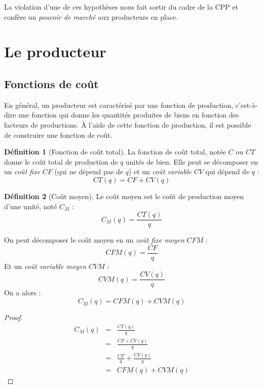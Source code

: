 \documentclass[
]{book}
\theoremstyle{definition}
\newtheorem{definition}{Définition}[chapter]
\theoremstyle{definition}
\theoremstyle{definition}
\theoremstyle{definition}
\theoremstyle{remark}
\begin{document}
La violation d'une de ces hypothèses nous fait sortir du cadre de la CPP et confère un \emph{pouvoir de marché} aux producteurs en place.

\hypertarget{le-producteur}{%
\section{Le producteur}\label{le-producteur}}

\hypertarget{fonctions-de-couxfbt}{%
\subsection{Fonctions de coût}\label{fonctions-de-couxfbt}}

En général, un producteur est caractérisé par une fonction de production, c'est-à-dire une fonction qui donne les quantités produites de biens en fonction des facteurs de productions.
À l'aide de cette fonction de production, il est possible de construire une fonction de coût.

\begin{definition}[Fonction de coût total]
La fonction de coût total, notée \(C\) ou \(CT\) donne le coût total de production de \(q\) unités de bien.
Elle peut se décomposer en un \emph{coût fixe} \(CF\) (qui ne dépend pas de \(q\)) et un \emph{coût variable} \(CV\) qui dépend de \(q\) :
\[CT(q)=CF+ CV(q)\]
\end{definition}

\begin{definition}[Coût moyen]
Le coût moyen est le coût de production moyen d'une unité, noté \(C_M\) :
\[C_M(q) = \frac{CT(q)}{q}\]
\end{definition}

On peut décomposer le coût moyen en un \emph{coût fixe moyen} \(CFM\) :
\[CFM(q)=\frac{CF}{q}\]
Et un \emph{coût variable moyen} \(CVM\) :
\[CVM(q)=\frac{CV(q)}{q}\]
On a alors :
\begin{equation}
C_M(q)=CFM(q) +CVM(q)
\label{eq:CM}
\end{equation}

\begin{proof}
\[
\begin{array}{rcl}
C_M(q) &=& \frac{CT(q)}{q}\\
 &=& \frac{CF + CV(q)}{q}\\
 &=& \frac{CF}{q}+\frac{CV(q)}{q}\\
 &=& CFM(q) + CVM(q)
\end{array}
\]
\end{proof}
\end{document}
